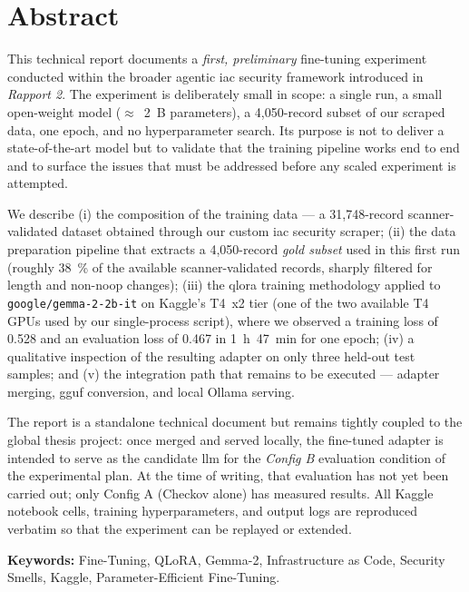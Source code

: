 \documentclass[12pt, a4paper]{report}
\begin{document}
\chapter*{Abstract}

This technical report documents a \emph{first, preliminary} fine-tuning
experiment conducted within the broader agentic \gls{iac} security framework
introduced in \emph{Rapport 2}. The experiment is deliberately small in scope:
a single run, a small open-weight model (\(\approx\)~2~B parameters), a
4{,}050-record subset of our scraped data, one epoch, and no hyperparameter
search. Its purpose is not to deliver a state-of-the-art model but to
validate that the training pipeline works end to end and to surface the
issues that must be addressed before any scaled experiment is attempted.

We describe (i) the composition of the training data --- a 31{,}748-record
scanner-validated dataset obtained through our custom \gls{iac} security
scraper; (ii) the data preparation pipeline that extracts a 4{,}050-record
\emph{gold subset} used in this first run (roughly 38~\% of the available
scanner-validated records, sharply filtered for length and non-noop changes);
(iii) the \gls{qlora} training methodology applied to
\texttt{google/gemma-2-2b-it} on Kaggle's T4~x2 tier (one of the two
available T4 GPUs used by our single-process script), where we observed
a training loss of 0.528 and an evaluation loss of 0.467 in 1~h~47~min for one
epoch; (iv) a qualitative inspection of the resulting adapter on only three
held-out test samples; and (v) the integration path that remains to be
executed --- adapter merging, \gls{gguf} conversion, and local Ollama
serving.

The report is a standalone technical document but remains tightly coupled to
the global thesis project: once merged and served locally, the fine-tuned
adapter is intended to serve as the candidate \gls{llm} for the \emph{Config
B} evaluation condition of the experimental plan. At the time of writing,
that evaluation has not yet been carried out; only Config A (Checkov alone)
has measured results. All Kaggle notebook cells, training hyperparameters,
and output logs are reproduced verbatim so that the experiment can be
replayed or extended.

\bigskip
\noindent\textbf{Keywords:} Fine-Tuning, QLoRA, Gemma-2, Infrastructure as Code,
Security Smells, Kaggle, Parameter-Efficient Fine-Tuning.
\end{document}
